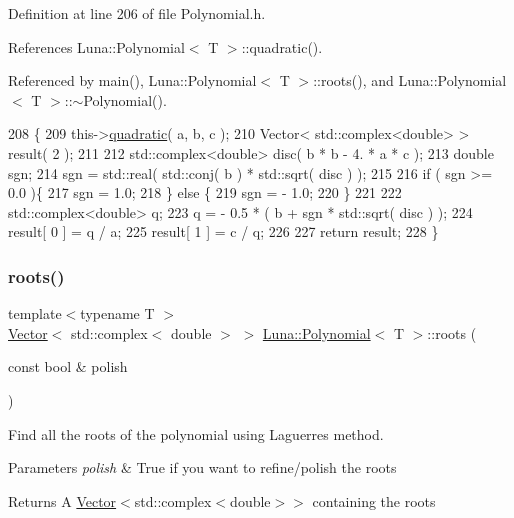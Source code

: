 Definition at line 206 of file Polynomial.\+h.



References Luna\+::\+Polynomial$<$ T $>$\+::quadratic().



Referenced by main(), Luna\+::\+Polynomial$<$ T $>$\+::roots(), and Luna\+::\+Polynomial$<$ T $>$\+::$\sim$\+Polynomial().


\begin{DoxyCode}
208     \{
209         this->\hyperlink{classLuna_1_1Polynomial_acfcaf54342579a975c876d353242b1b5}{quadratic}( a, b, c );
210         Vector< std::complex<double> > result( 2 );
211 
212         std::complex<double> disc( b * b - 4. * a * c );
213         \textcolor{keywordtype}{double} sgn;
214         sgn = std::real( std::conj( b ) * std::sqrt( disc ) );
215 
216         \textcolor{keywordflow}{if} ( sgn >= 0.0 )\{
217             sgn = 1.0;
218         \} \textcolor{keywordflow}{else} \{
219             sgn = - 1.0;
220         \}
221 
222         std::complex<double> q;
223         q = - 0.5 * ( b + sgn * std::sqrt( disc ) );
224         result[ 0 ] = q / a;
225         result[ 1 ] = c / q;
226 
227         \textcolor{keywordflow}{return} result;
228     \}
\end{DoxyCode}
\mbox{\label{classLuna_1_1Polynomial_ab045b5ac29660de6d5a54246ed1bec70}} 
\subsubsection{\texorpdfstring{roots()}{roots()}}
{\footnotesize\ttfamily template$<$typename T $>$ \\
\hyperlink{classLuna_1_1Vector}{Vector}$<$ std\+::complex$<$ double $>$ $>$ \hyperlink{classLuna_1_1Polynomial}{Luna\+::\+Polynomial}$<$ T $>$\+::roots (\begin{DoxyParamCaption}\item[{const bool \&}]{polish }\end{DoxyParamCaption})\hspace{0.3cm}{\ttfamily [inline]}}



Find all the roots of the polynomial using Laguerre\textquotesingle{}s method. 


\begin{DoxyParams}{Parameters}
{\em polish} & True if you want to refine/polish the roots \\
\hline
\end{DoxyParams}
\begin{DoxyReturn}{Returns}
A \hyperlink{classLuna_1_1Vector}{Vector}$<$std\+::complex$<$double$>$$>$ containing the roots 
\end{DoxyReturn}


